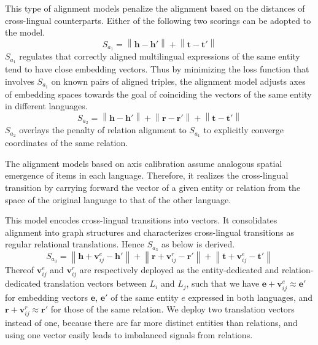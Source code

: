 \documentclass{article}
\begin{document}
This type of \mbox{alignment} models penalize the alignment based on the distances of cross-lingual counterparts. Either of the following two scorings can be adopted to the model.
\begin{equation*}
S_{a_{1}} = \left \| \mathbf{h} - \mathbf{h}' \right \| + \left \| \mathbf{t} - \mathbf{t}' \right \|
\end{equation*}
$S_{a_{1}}$ regulates that correctly aligned multilingual \mbox{expressions} of the same entity tend to have close embedding vectors. Thus by minimizing the loss function that involves $S_{a_{1}}$ on known pairs of aligned triples, the alignment model adjusts axes of embedding spaces towards the goal of coinciding the vectors of the same entity in different languages.
\begin{equation*}
S_{a_{2}} = \left \| \mathbf{h} - \mathbf{h}' \right \| + \left \| \mathbf{r} - \mathbf{r}' \right \| + \left \| \mathbf{t} - \mathbf{t}' \right \|
\end{equation*}
$S_{a_{2}}$ overlays the penalty of relation alignment to $S_{a_{1}}$ to explicitly converge coordinates of the same relation. \par

The alignment models based on axis calibration assume analogous spatial emergence of items in each language. Therefore, it realizes the cross-lingual transition by carrying forward the vector of a given entity or relation from the space of the original language to that of the other language.

This model encodes cross-lingual transitions into vectors. It consolidates alignment into graph structures and characterizes cross-lingual transitions as regular relational translations. Hence $S_{a_{3}}$ as below is derived. \begin{equation*}
S_{a_{3}} = \left \| \mathbf{h} + \mathbf{v}_{ij}^{e} - \mathbf{h}' \right \| + \left \| \mathbf{r} + \mathbf{v}_{ij}^{r} - \mathbf{r}' \right \| + \left \| \mathbf{t} + \mathbf{v}_{ij}^{e} - \mathbf{t}' \right \|
\end{equation*}
Thereof $\mathbf{v}_{ij}^{e}$ and $\mathbf{v}_{ij}^{r}$ are respectively deployed as the entity-dedicated and relation-dedicated translation vectors between $L_i$ and $L_j$, such that we have $\mathbf{e} + \mathbf{v}_{ij}^{e} \approx \mathbf{e'}$ for embedding vectors $\mathbf{e}$, $\mathbf{e}'$ of the same entity $e$ expressed in both languages, and $\mathbf{r} + \mathbf{v}_{ij}^{r} \approx \mathbf{r'}$ for those of the same relation. We deploy two translation vectors instead of one, because there are far more distinct entities than relations, and using one vector easily leads to imbalanced signals from relations. \par
\end{document}
